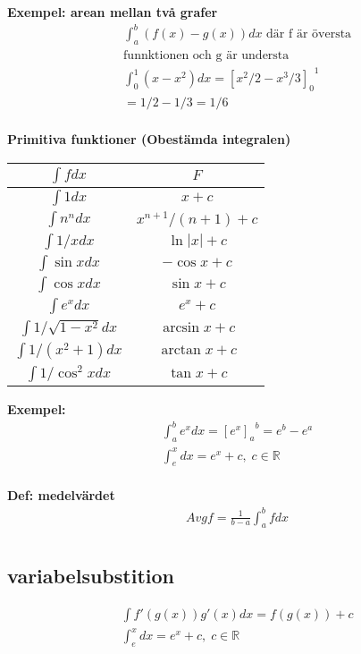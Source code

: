 \begin{multicols}{2}
\textbf{Exempel: arean mellan två grafer}
\begin{align*}
  &\int_a^b (f(x)-g(x))dx \text{ där f är översta} \\
  &\text{funnktionen och g är understa} \\
  &\int_0^1 (x-x^2)dx={{[x^2/2-x^3/3]}_0}^1 \\
  &=1/2-1/3=1/6 \\
\end{align*}


\textbf{Primitiva funktioner (Obestämda integralen)}
\begin{center}
\begin{tabular}{ |c|c| } 
  \hline
  $\int f dx$             & $F$              \\
  \hline
 $\int 1dx$               & $x+c$            \\
 $\int n^n dx$            & $x^{n+1}/(n+1)+c$ \\ 
 $\int 1/x dx$            & $\ln{|x|}+c$     \\  
 $\int\sin{x}dx$          & $-\cos{x}+c$     \\ 
 $\int\cos{x}dx$          & $\sin{x}+c$      \\
 $\int e^x dx$            & $e^x+c$          \\
 $\int 1/\sqrt{1-x^2} dx$ & $\arcsin{x}+c$   \\
 $\int 1/(x^2+1) dx$      & $\arctan{x}+c$   \\ %
 $\int 1/\cos^2{x} dx$    & $\tan{x}+c$      \\
 \hline
\end{tabular}
\end{center}

\textbf{Exempel: }
\begin{align*}
  &\int_a^b e^x dx = {{[e^x]}_a}^b = e^b-e^a \\
  &\int_ e^x dx=e^x + c, \; c \in \mathbb{R} \\
\end{align*}

\textbf{Def: medelvärdet}
\begin{align*}
  &Avgf = \frac{1}{b-a} \int_a^b f dx \\
\end{align*}


\subsection{variabelsubstition}
\begin{align*}
  &\int f'(g(x))g'(x) dx = f(g(x))+c \\
  &\int_ e^x dx=e^x + c, \; c \in \mathbb{R} \\
\end{align*}


\end{multicols}
